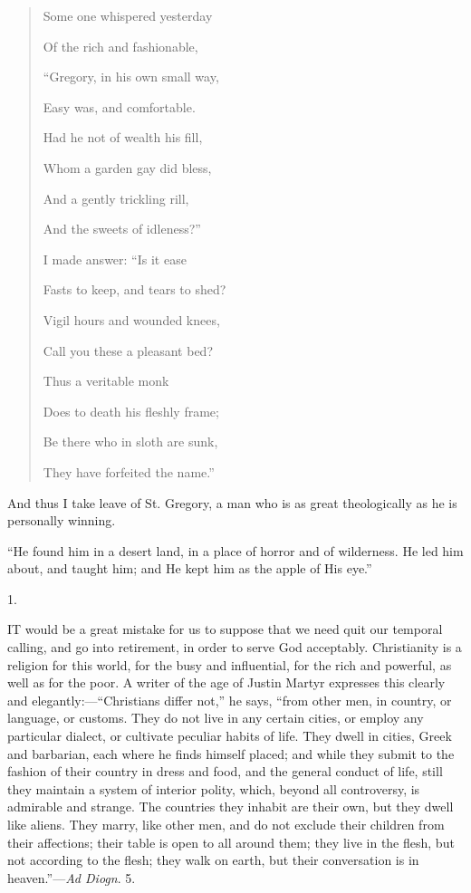 \begin{quote}

Some one whispered yesterday

Of the rich and fashionable,

``Gregory, in his own small way,

Easy was, and comfortable.

Had he not of wealth his fill,

Whom a garden gay did bless,

And a gently trickling rill,

And the sweets of idleness?''

I made answer: ``Is it ease

Fasts to keep, and tears to shed?

Vigil hours and wounded knees,

Call you these a pleasant bed?

Thus a veritable monk

Does to death his fleshly frame;

Be there who in sloth are sunk,

They have forfeited the name.''

\end{quote}

And thus I take leave of St. Gregory, a man who is as great
theologically as he is personally winning.


``He found him in a desert land, in a place of horror and
of wilderness. He led him about, and taught him; and He kept him as
the apple of His eye.''

1.

IT would be a great mistake for us to suppose
that we need quit our temporal calling, and go into retirement, in
order to serve God acceptably. Christianity is a religion for this
world, for the busy and influential, for the rich and powerful, as
well as for the poor. A writer of the age of Justin Martyr expresses
this clearly and elegantly:—``Christians differ not,'' he
says, ``from other men, in country, or language, or customs. They
do not live in any certain cities, or employ any particular dialect,
or cultivate peculiar habits of life. They dwell in cities, Greek and
barbarian, each where he finds himself placed; and while they submit
to the fashion of their country in dress and food, and the general
conduct of life, still they maintain a system of interior polity,
which, beyond all controversy, is admirable and strange. The countries
they inhabit are their own, but they dwell like aliens. They marry,
like other men, and do not exclude their children from their
affections; their table is open to all around them; they live in the
flesh, but not according to the flesh; they walk on earth, but
their conversation is in heaven.''—\emph{Ad Diogn}. 5.


